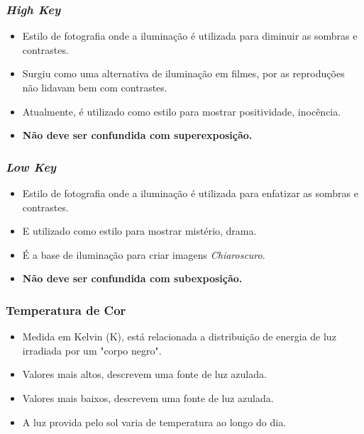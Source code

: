 
\begin{frame}
    \frametitle{\textit{High Key}}
    \begin{itemize}
      \item Estilo de fotografia onde a iluminação é utilizada para diminuir as
      sombras e contrastes.
      \item Surgiu como uma alternativa de iluminação em filmes, por as reproduções
      não lidavam bem com contrastes.
      \item Atualmente, é utilizado como estilo para mostrar positividade, inocência.
      \item \textbf{Não deve ser confundida com superexposição.}
    \end{itemize}
\end{frame}


\begin{frame}
    \frametitle{\textit{Low Key}}
    \begin{itemize}
      \item Estilo de fotografia onde a iluminação é utilizada para enfatizar as
      sombras e contrastes.
      \item E utilizado como estilo para mostrar mistério, drama.
      \item É a base de iluminação para criar imagens \textit{Chiaroscuro}.
      \item \textbf{Não deve ser confundida com subexposição.}
    \end{itemize}
\end{frame}



\begin{frame}
    \frametitle{Temperatura de Cor}
    \begin{itemize}
      \item Medida em Kelvin (K), está relacionada a distribuição de energia de luz
      irradiada por um "corpo negro".
      \item Valores mais altos, descrevem uma fonte de luz azulada.
      \item Valores mais baixos, descrevem uma fonte de luz azulada.
      \item A luz provida pelo sol varia de temperatura ao longo do dia.
    \end{itemize}
\end{frame}

